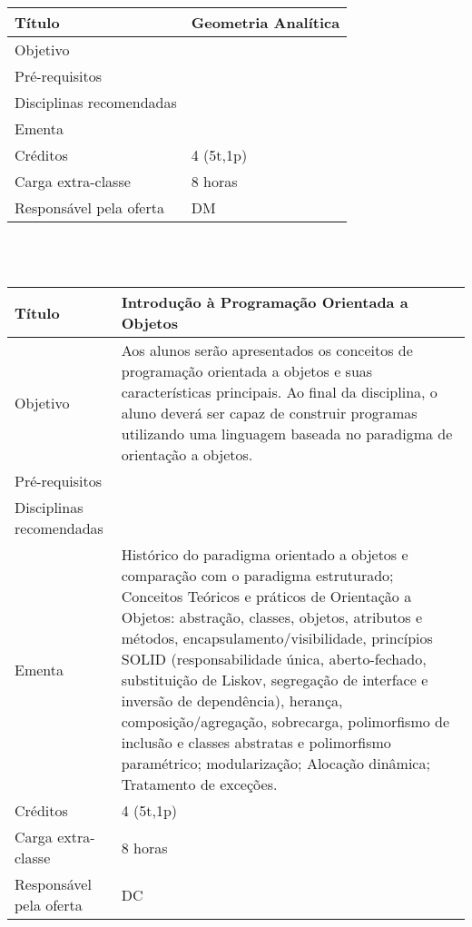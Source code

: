\begin{tabular}{|p{4.5cm}|p{10.0cm}|} \hline

Título & Geometria Analítica \\ \hline

Objetivo &  \\ \hline

Pré-requisitos &  \\ \hline

Disciplinas recomendadas & \\ \hline

Ementa &  \\ \hline

Créditos & 4 (5t,1p) \\ \hline
Carga extra-classe & 8 horas \\ \hline
Responsável pela oferta & DM \\ \hline
\end{tabular}
\\
\\


\begin{tabular}{|p{4.5cm}|p{10.0cm}|} \hline

Título & Introdução à Programação Orientada a Objetos \\ \hline

Objetivo & Aos alunos serão apresentados os conceitos de programação orientada a objetos e suas características principais. Ao final da disciplina, o aluno deverá ser capaz de construir programas utilizando uma linguagem baseada no paradigma de orientação a objetos.  \\ \hline

Pré-requisitos &  \\ \hline

Disciplinas recomendadas & \\ \hline

Ementa & Histórico do paradigma orientado a objetos e comparação com o paradigma estruturado; Conceitos Teóricos e práticos de Orientação a Objetos: abstração, classes, objetos, atributos e métodos, encapsulamento/visibilidade, princípios SOLID (responsabilidade única, aberto-fechado, substituição de Liskov, segregação de interface e inversão de dependência), herança, composição/agregação, sobrecarga, polimorfismo de inclusão e classes abstratas e polimorfismo paramétrico; modularização; Alocação dinâmica; Tratamento de exceções. \\ \hline

Créditos & 4 (5t,1p) \\ \hline
Carga extra-classe & 8 horas \\ \hline
Responsável pela oferta & DC \\ \hline
\end{tabular}
\\
\\


